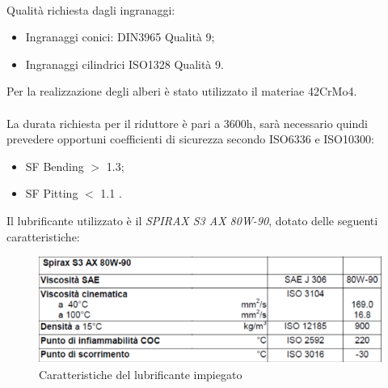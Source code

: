 \\
Qualità richiesta dagli ingranaggi:
\begin{itemize}
    \item Ingranaggi conici: DIN3965 Qualità 9;
    \item Ingranaggi cilindrici ISO1328 Qualità 9.
\end{itemize}
Per la realizzazione degli alberi è stato utilizzato il materiae 42CrMo4.\\
\\
La durata richiesta per il riduttore è pari a 3600h, sarà necessario quindi prevedere opportuni coefficienti di sicurezza secondo ISO6336 e ISO10300: 
\begin{itemize}
    \item SF Bending $>$ 1.3;
    \item SF Pitting $<$ 1.1 .
\end{itemize}
Il lubrificante utilizzato è il \textit{SPIRAX S3 AX 80W-90}, dotato delle seguenti caratteristiche:
\begin{figure}[h]
    \centering
    \includegraphics[scale=0.9]{Immagini/Lubrificante.png}
    \caption{Caratteristiche del lubrificante impiegato}
    \label{fig:Lubrificante}
\end{figure}

